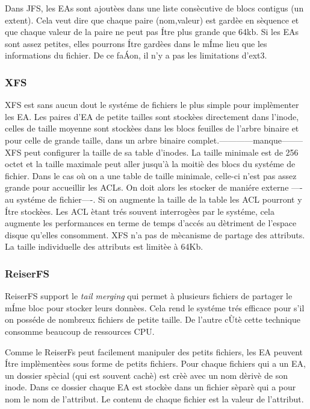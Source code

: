 Dans JFS, les EAs sont ajoutèes dans une liste consècutive de blocs contigus (un extent).  Cela veut dire que chaque paire (nom,valeur) est gardèe en sèquence et que chaque valeur de la paire ne peut pas Ítre plus grande que 64kb. Si les EAs sont assez petites, elles pourrons Ítre gardèes dans le mÍme lieu que les informations du fichier. De ce faÁon, il n'y a pas les limitations d'ext3.
 
\subsubsection*{XFS}
XFS est sans aucun dout le systéme de fichiers le plus simple pour implèmenter les EA. Les paires d'EA de petite tailles sont stockèes directement dans l'inode, celles de taille moyenne sont stockèes dans les blocs feuilles de l'arbre binaire et pour celle de grande taille, dans un arbre binaire complet.------------manque--------
XFS peut configurer la taille de sa table d'inodes. La taille minimale est de 256 octet et la taille maximale peut aller jusqu'à la moitiè des blocs du systéme de fichier. Dans le cas où on a une table de taille minimale, celle-ci n'est pas assez grande pour accueillir les ACLs. On doit alors les stocker de maniére externe ----au systéme de fichier----. Si on augmente la taille de la table les ACL pourront y Ítre stockèes. Les ACL ètant trés souvent interrogèes par le systéme, cela augmente les performances en terme de temps d'accés au dètriment de l'espace disque qu'elles consomment.
XFS n'a pas de mècanisme de partage des attributs. La taille individuelle des attributs est limitèe à 64Kb.
 
\subsubsection*{ReiserFS}
ReiserFS support le \emph{tail merging} qui permet à plusieurs fichiers de partager le mÍme bloc pour stocker leurs donnèes. Cela rend le systéme trés efficace pour s'il on posséde de nombreux fichiers de petite taille. De l'autre cÙtè cette technique consomme beaucoup de ressources CPU. 

Comme le ReiserFs peut facilement manipuler des petits fichiers, les EA peuvent Ítre implèmentèes sous forme de petits fichiers. Pour chaque fichiers qui a un EA, un dossier spècial (qui est souvent cachè) est crèè avec un nom dèrivè de son inode. Dans ce dossier chaque EA est stockèe dans un fichier sèparè qui a pour nom le nom de l'attribut. Le contenu de chaque fichier est la valeur de l'attribut.

